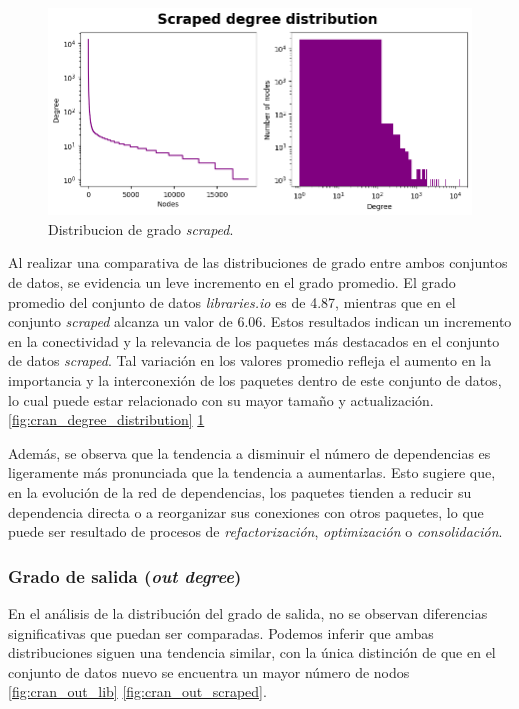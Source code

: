 \begin{figure}[ht!]
    \begin{center}
        \includegraphics[width=1\textwidth]{img/cran/distribucion_grado2.png}
        \caption{Distribucion de grado \textit{scraped}.}
        \label{fig:cran_degree_distribution_scraped}
    \end{center}
\end{figure}

Al realizar una comparativa de las distribuciones de grado entre ambos conjuntos de datos,
se evidencia un leve incremento en el grado promedio. El grado promedio del conjunto de datos
\textit{libraries.io} es de 4.87, mientras que en el conjunto \textit{scraped} alcanza un valor
de 6.06. Estos resultados indican un incremento en la conectividad y la relevancia de los
paquetes más destacados en el conjunto de datos \textit{scraped}. Tal variación en los valores
promedio refleja el aumento en la importancia y la interconexión de los paquetes dentro de este
conjunto de datos, lo cual puede estar relacionado con su mayor tamaño y actualización.
\ref{fig:cran_degree_distribution} \ref{fig:cran_degree_distribution_scraped}

Además, se observa que la tendencia a disminuir el número de dependencias es ligeramente
más pronunciada que la tendencia a aumentarlas. Esto sugiere que, en la evolución de
la red de dependencias, los paquetes tienden a reducir su dependencia directa o a
reorganizar sus conexiones con otros paquetes, lo que puede ser resultado de procesos
de \textit{refactorización}, \textit{optimización} o \textit{consolidación}.


\subsubsection{Grado de salida (\textit{out degree})}


En el análisis de la distribución del grado de salida, no se observan diferencias significativas
que puedan ser comparadas. Podemos inferir que ambas distribuciones siguen una tendencia
similar, con la única distinción de que en el conjunto de datos nuevo se encuentra un mayor
número de nodos \ref{fig:cran_out_lib} \ref{fig:cran_out_scraped}.

